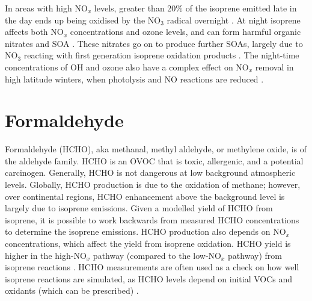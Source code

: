       In areas with high NO$_x$ levels, greater than 20\% of the isoprene emitted late in the day ends up being oxidised by the NO$_3$ radical overnight \parencite{Brown2009}.
      At night isoprene affects both NO$_x$ concentrations and ozone levels, and can form harmful organic nitrates and SOA \parencite{Brown2009, Mao2013}.
      These nitrates go on to produce further SOAs, largely due to NO$_3$ reacting with first generation isoprene oxidation products \parencite{Rollins2009}.
      The night-time concentrations of OH and ozone also have a complex effect on NO$_x$ removal in high latitude winters, when photolysis and NO reactions are reduced \parencite{Ayers2006}.
      
    
\section{Formaldehyde}
\label{LR:HCHO}

  Formaldehyde (HCHO), aka methanal, methyl aldehyde, or methylene oxide, is of the aldehyde family.
  HCHO is an OVOC that is toxic, allergenic, and a potential carcinogen.
  Generally, HCHO is not dangerous at low background atmospheric levels.
  Globally, HCHO production is due to the oxidation of methane; however, over continental regions, HCHO enhancement above the background level is largely due to isoprene emissions.
  Given a modelled yield of HCHO from isoprene, it is possible to work backwards from measured HCHO concentrations to determine the isoprene emissions.
  HCHO production also depends on NO$_x$ concentrations, which affect the yield from isoprene oxidation.
  HCHO yield is higher in the high-NO$_x$ pathway (compared to the low-NO$_x$ pathway) from isoprene reactions \parencite{Marais2012}.
  HCHO measurements are often used as a check on how well isoprene reactions are simulated, as HCHO levels depend on initial VOCs and oxidants (which can be prescribed) \parencite{Marvin2017}.
  
  
